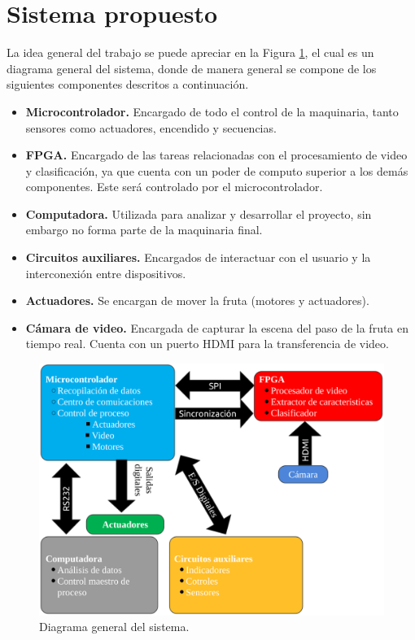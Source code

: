 \documentclass[twoside,spanish,ESP,MSc]{plantillaLabUPV}
\theoremstyle{definition}
\begin{document}
\section{Sistema propuesto}
La idea general del trabajo se puede apreciar en la Figura \ref{sis}, el cual es un diagrama general del sistema, donde de manera general se compone de los siguientes componentes descritos a continuación.

\begin{itemize}
	\item \textbf{Microcontrolador.} Encargado de todo el control de la maquinaria, tanto sensores como actuadores, encendido y secuencias. 
	\item \textbf{FPGA.} Encargado de las tareas relacionadas con el procesamiento de video y clasificación, ya que cuenta con un poder de computo superior a los demás componentes. Este será controlado por el microcontrolador.
	\item \textbf{Computadora.} Utilizada para analizar y desarrollar el proyecto, sin embargo no forma parte de la maquinaria final.
	\item \textbf{Circuitos auxiliares.} Encargados de interactuar con el usuario y la interconexión entre dispositivos.
	\item \textbf{Actuadores.} Se encargan de mover la fruta (motores y actuadores).
	\item \textbf{Cámara de video.} Encargada de capturar la escena del paso de la fruta en tiempo real. Cuenta con un puerto HDMI para la transferencia de video.
\end{itemize}


\begin{figure}[!tbh]
	\centering
	
	\includegraphics*[scale=0.4]{sis} 
	\caption{Diagrama general del sistema.}
	\label{sis}
\end{figure}
\end{document}
